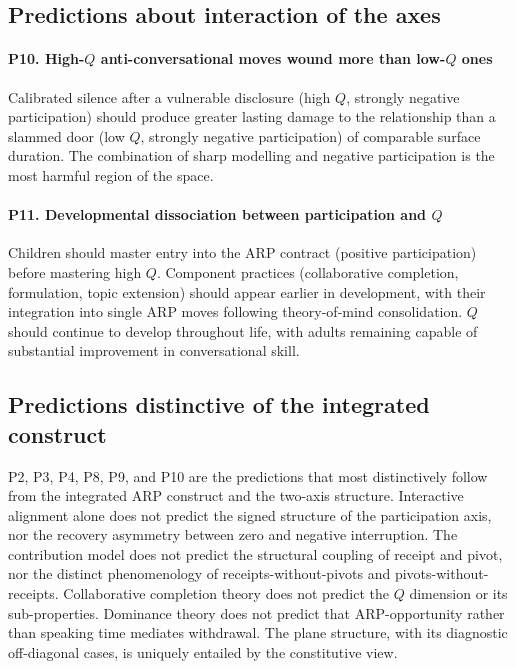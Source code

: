 \subsection{Predictions about interaction of the axes}

\paragraph{P10. High-$Q$ anti-conversational moves wound more than low-$Q$ ones} Calibrated silence after a vulnerable disclosure (high $Q$, strongly negative participation) should produce greater lasting damage to the relationship than a slammed door (low $Q$, strongly negative participation) of comparable surface duration. The combination of sharp modelling and negative participation is the most harmful region of the space.

\paragraph{P11. Developmental dissociation between participation and $Q$} Children should master entry into the ARP contract (positive participation) before mastering high $Q$. Component practices (collaborative completion, formulation, topic extension) should appear earlier in development, with their integration into single ARP moves following theory-of-mind consolidation. $Q$ should continue to develop throughout life, with adults remaining capable of substantial improvement in conversational skill.

\subsection{Predictions distinctive of the integrated construct}

P2, P3, P4, P8, P9, and P10 are the predictions that most distinctively follow from the integrated ARP construct and the two-axis structure. Interactive alignment alone does not predict the signed structure of the participation axis, nor the recovery asymmetry between zero and negative interruption. The contribution model does not predict the structural coupling of receipt and pivot, nor the distinct phenomenology of receipts-without-pivots and pivots-without-receipts. Collaborative completion theory does not predict the $Q$ dimension or its sub-properties. Dominance theory does not predict that ARP-opportunity rather than speaking time mediates withdrawal. The plane structure, with its diagnostic off-diagonal cases, is uniquely entailed by the constitutive view.


